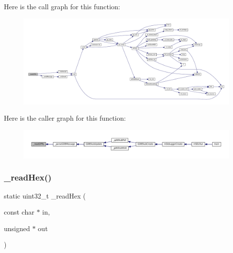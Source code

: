 Here is the call graph for this function\+:
\nopagebreak
\begin{figure}[H]
\begin{center}
\leavevmode
\includegraphics[width=350pt]{gdb-stub_8c_ab27c309a3277a098b285f7b0e65d4372_cgraph}
\end{center}
\end{figure}
Here is the caller graph for this function\+:
\nopagebreak
\begin{figure}[H]
\begin{center}
\leavevmode
\includegraphics[width=350pt]{gdb-stub_8c_ab27c309a3277a098b285f7b0e65d4372_icgraph}
\end{center}
\end{figure}
\mbox{\label{gdb-stub_8c_a480f57f311cfc4a8cd9182b20ca8addc}} 
\subsubsection{\texorpdfstring{\+\_\+read\+Hex()}{\_readHex()}}
{\footnotesize\ttfamily static uint32\+\_\+t \+\_\+read\+Hex (\begin{DoxyParamCaption}\item[{const char $\ast$}]{in,  }\item[{unsigned $\ast$}]{out }\end{DoxyParamCaption})\hspace{0.3cm}{\ttfamily [static]}}

